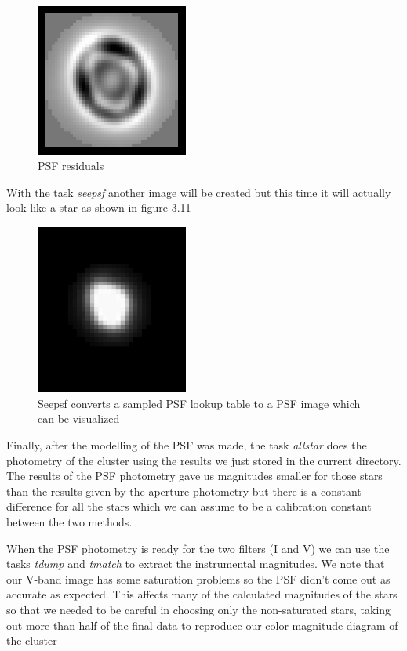 \begin{figure}[H]
\centering
\includegraphics[width=5cm]{images/psf2.png}
\caption[PSF residuals]{PSF residuals}
\end{figure}

With the task \textit{seepsf} another image will be created but this time it will actually look like a star as shown in figure 3.11

\begin{figure}[H]
\centering
\includegraphics[width=5cm]{images/psf3.png}
\caption[PSF image created by the task Seepsf]{Seepsf converts a sampled PSF lookup table to a PSF image which can be visualized}
\end{figure}

Finally, after the modelling of the PSF was made, the task \textit{allstar} does the photometry of the cluster using the results we just stored in the current directory. The results of the PSF photometry gave us magnitudes smaller for those stars than the results given by the aperture photometry but there is a constant difference for all the stars which we can assume to be a calibration constant between the two methods.

When the PSF photometry is ready for the two filters (I and V) we can use the tasks \textit{tdump} and \textit{tmatch} to extract the instrumental magnitudes. We note that our V-band image has some saturation problems so the PSF didn't come out as accurate as expected. This affects many of the calculated magnitudes of the stars so that we needed to be careful in choosing only the non-saturated stars, taking out more than half of the final data to reproduce our color-magnitude diagram of the cluster 

